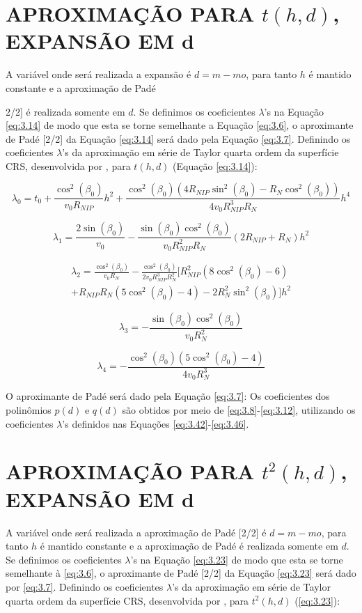 \section{APROXIMAÇÃO PARA $t(h,d)$, EXPANSÃO EM d}
\label{sec:6.4}
A variável onde será realizada a expansão é $d=m-mo$, 
para tanto $h$ é mantido constante e a aproximação de Padé {2/2] é realizada somente em $d$.
Se definimos os coeficientes $\lambda$'s na Equação \ref{eq:3.14} de modo que esta se torne semelhante 
a Equação \ref{eq:3.6},
o aproximante de Padé [2/2] da Equação \ref{eq:3.14} será dado pela Equação \ref{eq:3.7}.
Definindo os coeficientes $\lambda$'s da aproximação em série de Taylor quarta ordem da superfície CRS, 
desenvolvida por \cite{germam}, para $t(h,d)$ (Equação \ref{eq:3.14}):

\begin{equation}
\label{eq:6.42}
 \lambda_0=t_0+\frac{\cos^2(\beta_0)}{v_0R_{NIP}}h^2+\frac{\cos^2(\beta_0)(4R_{NIP}\sin^2(\beta_0)-R_N\cos^2(\beta_0))}{4v_0R_{NIP}^3R_N}h^4 
 \end{equation}
 
\begin{equation}
\label{eq:6.43}
 \lambda_1=\frac{2\sin(\beta_0)}{v_0}-\frac{\sin(\beta_0)\cos^2(\beta_0)}{v_0R_{NIP}^2R_N}(2R_{NIP}+R_N)h^2  
\end{equation}

\begin{multline}
\label{eq:6.44}
\lambda_2=\frac{\cos^2(\beta_0)}{v_0R_N}-\frac{\cos^2(\beta_0)}{2v_0R_{NIP}^3R_N^2}[R_{NIP}^2(8\cos^2(\beta_0)-6) \\
 +R_{NIP}R_N(5\cos^2(\beta_0)-4)-2R_N^2\sin^2(\beta_0)]h^2
\end{multline}

\begin{equation}
\label{eq:6.45}
\lambda_3=-\frac{\sin(\beta_0)\cos^2(\beta_0)}{v_0R_N^2}
\end{equation}

\begin{equation}
\label{eq:6.46}
\lambda_4=-\frac{\cos^2(\beta_0)(5\cos^2(\beta_0)-4)}{4v_0R_N^3}
\end{equation}

O aproximante de Padé será dado pela Equação \ref{eq:3.7}:
Os coeficientes dos polinômios $p(d)$ e $q(d)$ são obtidos por meio de \ref{eq:3.8}-\ref{eq:3.12},
utilizando os coeficientes $\lambda$'s definidos nas Equações \ref{eq:3.42}-\ref{eq:3.46}.

\section{APROXIMAÇÃO PARA $t^2(h,d)$, EXPANSÃO EM d}
\label{sec:6.5}
A variável onde será realizada a aproximação de Padé [2/2] é $d=m-mo$, 
para tanto $h$ é mantido constante e a aproximação de Padé é realizada somente em $d$.
Se definimos os coeficientes $\lambda$'s na Equação \ref{eq:3.23} de modo que esta se torne semelhante à \ref{eq:3.6},
o aproximante de Padé [2/2] da Equação \ref{eq:3.23} será dado por \ref{eq:3.7}.
Definindo os coeficientes $\lambda$'s da aproximação em série de Taylor quarta ordem da superfície CRS, 
desenvolvida por \cite{germam}, para $t^2(h,d)$ (\ref{eq:3.23}):

}
